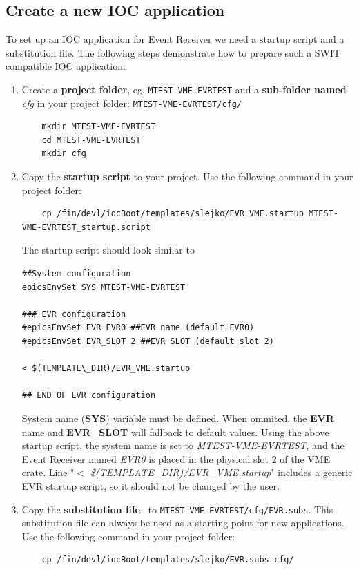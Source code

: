 \documentclass[12pt,a4paper]{article}
\begin{document}
\subsection{Create a new IOC application}\label{sec:Create a new IOC application}
To set up an IOC application for Event Receiver we need a startup script and a substitution file. The following steps demonstrate how to prepare such a SWIT compatible IOC application:
\begin{enumerate}

	\item Create a \textbf{project folder}, eg. \texttt{MTEST-VME-EVRTEST} and a \textbf{sub-folder named} \textit{cfg} in your project folder: \texttt{MTEST-VME-EVRTEST/cfg/}
\begin{lstlisting}
	mkdir MTEST-VME-EVRTEST
	cd MTEST-VME-EVRTEST
	mkdir cfg
\end{lstlisting}

	\item Copy the \textbf{startup script} to your project. Use the following command in your project folder:
\begin{lstlisting}
	cp /fin/devl/iocBoot/templates/slejko/EVR_VME.startup MTEST-VME-EVRTEST_startup.script
\end{lstlisting}

	The startup script should look similar to 
\begin{lstlisting}
##System configuration
epicsEnvSet SYS MTEST-VME-EVRTEST

### EVR configuration
#epicsEnvSet EVR EVR0 ##EVR name (default EVR0)
#epicsEnvSet EVR_SLOT 2 ##EVR SLOT (default slot 2)

< $(TEMPLATE\_DIR)/EVR_VME.startup

## END OF EVR configuration
\end{lstlisting}

System name (\textbf{SYS}) variable must be defined. When ommited, the \textbf{EVR} name and \textbf{EVR\_SLOT} will fallback to default values. Using the above startup script, the system name is set to \textit{MTEST-VME-EVRTEST}, and the Event Receiver named \textit{EVR0} is placed in the physical slot 2 of the VME crate. Line "\textit{$<$ \$(TEMPLATE\_DIR)/EVR\_VME.startup}" includes a generic EVR startup script, so it should not be changed by the user.

	\item Copy the \textbf{substitution file}~\cite{substitution_git} to \texttt{MTEST-VME-EVRTEST/cfg/EVR.subs}. This substitution file can always be used as a starting point for new applications. Use the following command in your project folder: 
\begin{lstlisting}
	cp /fin/devl/iocBoot/templates/slejko/EVR.subs cfg/
\end{lstlisting}
\end{enumerate}
\end{document}
